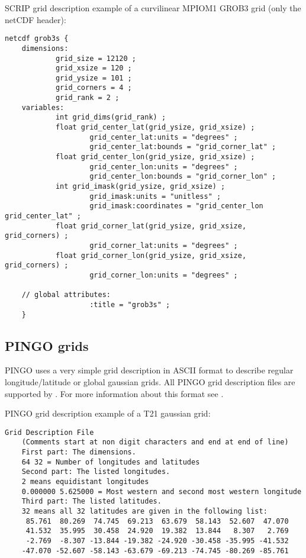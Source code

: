 SCRIP grid description example of a curvilinear MPIOM1 GROB3 grid (only the netCDF header):
\begin{lstlisting}[frame=single, backgroundcolor=\color{zebg}, basicstyle=\footnotesize]
    netcdf grob3s {
    dimensions:
            grid_size = 12120 ;
            grid_xsize = 120 ;
            grid_ysize = 101 ;
            grid_corners = 4 ;
            grid_rank = 2 ;
    variables:
            int grid_dims(grid_rank) ;
            float grid_center_lat(grid_ysize, grid_xsize) ;
                    grid_center_lat:units = "degrees" ;
                    grid_center_lat:bounds = "grid_corner_lat" ;
            float grid_center_lon(grid_ysize, grid_xsize) ;
                    grid_center_lon:units = "degrees" ;
                    grid_center_lon:bounds = "grid_corner_lon" ;
            int grid_imask(grid_ysize, grid_xsize) ;
                    grid_imask:units = "unitless" ;
                    grid_imask:coordinates = "grid_center_lon grid_center_lat" ;
            float grid_corner_lat(grid_ysize, grid_xsize, grid_corners) ;
                    grid_corner_lat:units = "degrees" ;
            float grid_corner_lon(grid_ysize, grid_xsize, grid_corners) ;
                    grid_corner_lon:units = "degrees" ;

    // global attributes:
                    :title = "grob3s" ;
    }
\end{lstlisting}

\subsection{PINGO grids}

PINGO uses a very simple grid description in ASCII format
to describe regular longitude/latitude or global gaussian grids.
All PINGO grid description files are supported by \CDO. 
For more information about this format see \cite{PINGO}.

\vspace{2mm}

PINGO grid description example of a T21 gaussian grid:
\begin{lstlisting}[frame=single, backgroundcolor=\color{zebg}, basicstyle=\footnotesize]
    Grid Description File
    (Comments start at non digit characters and end at end of line)
    First part: The dimensions.
    64 32 = Number of longitudes and latitudes
    Second part: The listed longitudes.
    2 means equidistant longitudes
    0.000000 5.625000 = Most western and second most western longitude
    Third part: The listed latitudes.
    32 means all 32 latitudes are given in the following list:
     85.761  80.269  74.745  69.213  63.679  58.143  52.607  47.070
     41.532  35.995  30.458  24.920  19.382  13.844   8.307   2.769
     -2.769  -8.307 -13.844 -19.382 -24.920 -30.458 -35.995 -41.532
    -47.070 -52.607 -58.143 -63.679 -69.213 -74.745 -80.269 -85.761
\end{lstlisting}

